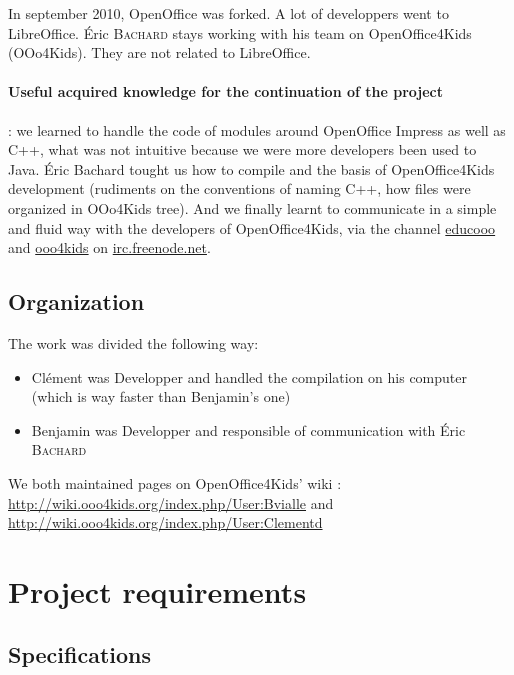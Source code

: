 \documentclass[a4paper,11pt]{article}
\begin{document}
In september 2010, OpenOffice was forked. A lot of developpers went to
LibreOffice. Éric \textsc{Bachard} stays working with his team on
OpenOffice4Kids (OOo4Kids). They are not related to LibreOffice.

\paragraph{Useful acquired knowledge for the continuation of the project} : we
learned to handle the code of modules around OpenOffice Impress as well as
C++, what was not intuitive because we were more developers been used to Java.
Éric Bachard tought us how to compile and the basis of OpenOffice4Kids
development (rudiments on the conventions of naming C++, how files were
organized in OOo4Kids tree). And we finally learnt to communicate in a simple
and fluid way with the developers of OpenOffice4Kids, via the channel
\url{educooo} and \url{ooo4kids} on \url{irc.freenode.net}.

\subsection*{Organization}

The work was divided the following way:
\begin{itemize}
\item Clément was Developper and handled the compilation on his computer
(which is way faster than Benjamin's one)
\item Benjamin was Developper and responsible of communication with Éric \textsc{Bachard}
\end{itemize}

We both maintained pages on OpenOffice4Kids' wiki :
\url{http://wiki.ooo4kids.org/index.php/User:Bvialle} and
\url{http://wiki.ooo4kids.org/index.php/User:Clementd}

\newpage

\fancyfoot[C]{\thepage}
\section*{Project requirements}

\subsection*{Specifications}
\end{document}
